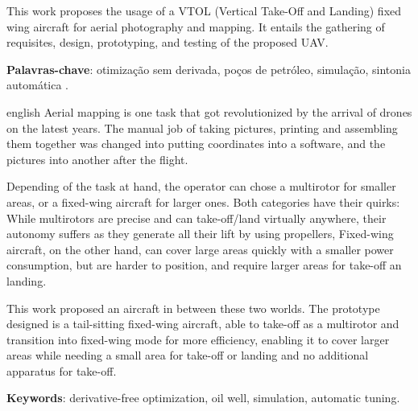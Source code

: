 
\setlength{\absparsep}{18pt} %
\begin{resumo}

This work proposes the usage of a VTOL (Vertical Take-Off and Landing) fixed wing aircraft for aerial photography and mapping. It entails the gathering of requisites, design, prototyping, and testing of the proposed UAV.


 \textbf{Palavras-chave}: otimização sem derivada, poços de petróleo, simulação, sintonia automática .
\end{resumo}

\begin{resumo}[Abstract]
 \begin{otherlanguage*}{english}
Aerial mapping is one task that got revolutionized by the arrival of drones on the latest years. The manual job of taking pictures, printing and assembling them together was changed into putting coordinates into a software, and the pictures into another after the flight.

Depending of the task at hand, the operator can chose a multirotor for smaller areas, or a fixed-wing aircraft for larger ones. Both categories have their quirks: While multirotors are precise and can take-off/land virtually anywhere, their autonomy suffers as they generate all their lift by using propellers, Fixed-wing aircraft, on the other hand, can cover large areas quickly with a smaller power consumption, but are harder to position, and require larger areas for take-off an landing.
 
This work proposed an aircraft in between these two worlds. The prototype designed is a tail-sitting fixed-wing aircraft, able to take-off as a multirotor and transition into fixed-wing mode for more efficiency, enabling it to cover larger areas while needing a small area for take-off or landing and no additional apparatus for take-off.	


   \vspace{\onelineskip}
 
   \noindent 
   \textbf{Keywords}: derivative-free optimization, oil well, simulation, automatic tuning.
 \end{otherlanguage*}
\end{resumo}
